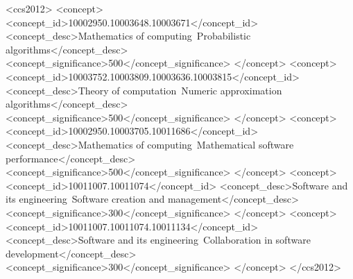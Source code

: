 \documentclass[acmtog, authorversion]{acmart}
\begin{document}
%
%
%
%

\begin{CCSXML}
<ccs2012>
<concept>
<concept_id>10002950.10003648.10003671</concept_id>
<concept_desc>Mathematics of computing~Probabilistic algorithms</concept_desc>
<concept_significance>500</concept_significance>
</concept>
<concept>
<concept_id>10003752.10003809.10003636.10003815</concept_id>
<concept_desc>Theory of computation~Numeric approximation algorithms</concept_desc>
<concept_significance>500</concept_significance>
</concept>
<concept>
<concept_id>10002950.10003705.10011686</concept_id>
<concept_desc>Mathematics of computing~Mathematical software performance</concept_desc>
<concept_significance>500</concept_significance>
</concept>
<concept>
<concept_id>10011007.10011074</concept_id>
<concept_desc>Software and its engineering~Software creation and management</concept_desc>
<concept_significance>300</concept_significance>
</concept>
<concept>
<concept_id>10011007.10011074.10011134</concept_id>
<concept_desc>Software and its engineering~Collaboration in software development</concept_desc>
<concept_significance>300</concept_significance>
</concept>
</ccs2012>
\end{CCSXML}
\end{document}
